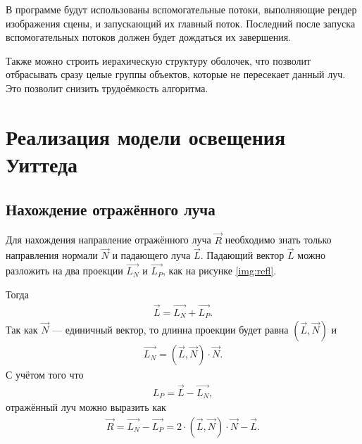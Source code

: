 В программе будут использованы вспомогательные потоки, выполняющие рендер изображения сцены, и запускающий их главный поток. Последний после запуска вспомогательных потоков должен будет дождаться их завершения.

Также можно строить иерахическую структуру оболочек, что позволит отбрасывать сразу целые группы объектов, которые не пересекает данный луч. Это позволит снизить трудоёмкость алгоритма.

\section{Реализация модели освещения Уиттеда}
\subsection{Нахождение отражённого луча}

Для нахождения направление отражённого луча $\vec{R}$ необходимо знать только направления нормали $\vec{N}$ и падающего луча $\vec{L}$. Падающий вектор $\vec{L}$ можно разложить на два проекции $\vec{L_{N}}$ и $\vec{L_{P}}$, как на рисунке \ref{img:refl}. 

\pagebreak
{}

Тогда 
\begin{equation} \label{eq:ab}
	\begin{aligned}
		\vec{L} = \vec{L_{N}} + \vec{L_{P}}.
	\end{aligned}
\end{equation}
Так как $\vec{N}$ --- единичный вектор, то длинна проекции будет равна $(\vec{L}, \vec{N})$ и
\begin{equation} \label{eq:ab}
 	\begin{aligned}
 		\vec{L_{N}} = (\vec{L}, \vec{N})\cdot \vec{N}.
 	\end{aligned}
\end{equation}
С учётом того что
\begin{equation} \label{eq:ab}
	\begin{aligned}
		{L_{P}} = \vec{L} - \vec{L_{N}},
	\end{aligned}
\end{equation}
отражённый луч можно выразить как
\begin{equation} \label{eq:ab}
	\begin{aligned}
		\vec{R} = \vec{L_{N}} - \vec{L_{P}} = 2\cdot (\vec{L}, \vec{N})\cdot \vec{N} - \vec{L}.
	\end{aligned}
\end{equation}

